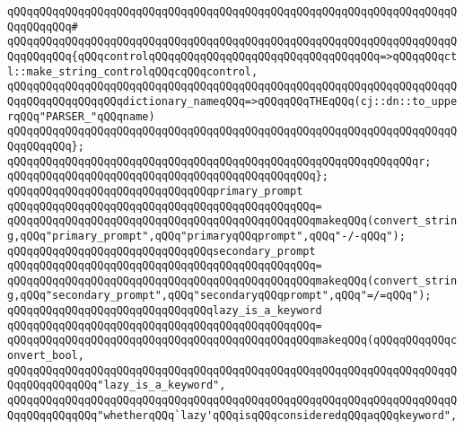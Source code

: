 \verb|qQQqqQQqqQQqqQQqqQQqqQQqqQQqqQQqqQQqqQQqqQQqqQQqqQQqqQQqqQQqqQQqqQQqqQQqqQQqqQQq#|\newline
\verb|qQQqqQQqqQQqqQQqqQQqqQQqqQQqqQQqqQQqqQQqqQQqqQQqqQQqqQQqqQQqqQQqqQQqqQQqqQQqqQQq{qQQqcontrolqQQqqQQqqQQqqQQqqQQqqQQqqQQqqQQqqQQq=>qQQqqQQqctl::make_string_controlqQQqcqQQqcontrol,|\newline
\verb|qQQqqQQqqQQqqQQqqQQqqQQqqQQqqQQqqQQqqQQqqQQqqQQqqQQqqQQqqQQqqQQqqQQqqQQqqQQqqQQqqQQqqQQqdictionary_nameqQQq=>qQQqqQQqTHEqQQq(cj::dn::to_upperqQQq"PARSER_"qQQqname)|\newline
\verb|qQQqqQQqqQQqqQQqqQQqqQQqqQQqqQQqqQQqqQQqqQQqqQQqqQQqqQQqqQQqqQQqqQQqqQQqqQQqqQQq};|\newline
\verb|qQQqqQQqqQQqqQQqqQQqqQQqqQQqqQQqqQQqqQQqqQQqqQQqqQQqqQQqqQQqqQQqr;|\newline
\verb|qQQqqQQqqQQqqQQqqQQqqQQqqQQqqQQqqQQqqQQqqQQqqQQq};|\newline
\newline
\newline
\verb|qQQqqQQqqQQqqQQqqQQqqQQqqQQqqQQqprimary_prompt|\newline
\verb|qQQqqQQqqQQqqQQqqQQqqQQqqQQqqQQqqQQqqQQqqQQqqQQq=|\newline
\verb|qQQqqQQqqQQqqQQqqQQqqQQqqQQqqQQqqQQqqQQqqQQqqQQqmakeqQQq(convert_string,qQQq"primary_prompt",qQQq"primaryqQQqprompt",qQQq"-/-qQQq");|\newline
\newline
\newline
\verb|qQQqqQQqqQQqqQQqqQQqqQQqqQQqqQQqsecondary_prompt|\newline
\verb|qQQqqQQqqQQqqQQqqQQqqQQqqQQqqQQqqQQqqQQqqQQqqQQq=|\newline
\verb|qQQqqQQqqQQqqQQqqQQqqQQqqQQqqQQqqQQqqQQqqQQqqQQqmakeqQQq(convert_string,qQQq"secondary_prompt",qQQq"secondaryqQQqprompt",qQQq"=/=qQQq");|\newline
\newline
\newline
\verb|qQQqqQQqqQQqqQQqqQQqqQQqqQQqqQQqlazy_is_a_keyword|\newline
\verb|qQQqqQQqqQQqqQQqqQQqqQQqqQQqqQQqqQQqqQQqqQQqqQQq=|\newline
\verb|qQQqqQQqqQQqqQQqqQQqqQQqqQQqqQQqqQQqqQQqqQQqqQQqmakeqQQq(qQQqqQQqqQQqconvert_bool,|\newline
\verb|qQQqqQQqqQQqqQQqqQQqqQQqqQQqqQQqqQQqqQQqqQQqqQQqqQQqqQQqqQQqqQQqqQQqqQQqqQQqqQQqqQQq"lazy_is_a_keyword",|\newline
\verb|qQQqqQQqqQQqqQQqqQQqqQQqqQQqqQQqqQQqqQQqqQQqqQQqqQQqqQQqqQQqqQQqqQQqqQQqqQQqqQQqqQQq"whetherqQQq`lazy'qQQqisqQQqconsideredqQQqaqQQqkeyword",|\newline
